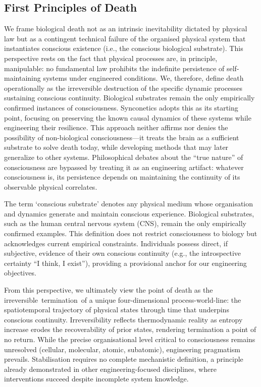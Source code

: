 \documentclass[10pt]{article}
\begin{document}
\begin{sloppypar}
  \subsection{First Principles of Death}
  \label{sec:first-principles}

  We frame biological death not as an intrinsic inevitability dictated by physical law but as a contingent technical failure of the organised physical system that instantiates conscious existence (i.e., the conscious biological substrate). This perspective rests on the fact that physical processes are, in principle, manipulable: no fundamental law prohibits the indefinite persistence of self-maintaining systems under engineered conditions. We, therefore, define death operationally as the irreversible destruction of the specific dynamic processes sustaining conscious continuity. Biological substrates remain the only empirically confirmed instances of consciousness. Synconetics adopts this as its starting point, focusing on preserving the known causal dynamics of these systems while engineering their resilience. This approach neither affirms nor denies the possibility of non-biological consciousness—it treats the brain as a sufficient substrate to solve death today, while developing methods that may later generalize to other systems. Philosophical debates about the “true nature” of consciousness are bypassed by treating it as an engineering artifact: whatever consciousness is, its persistence depends on maintaining the continuity of its observable physical correlates.

  The term ‘conscious substrate’ denotes any physical medium whose organisation and dynamics generate and maintain conscious experience. Biological substrates, such as the human central nervous system (CNS), remain the only empirically confirmed examples. This definition does not restrict consciousness to biology but acknowledges current empirical constraints. Individuals possess direct, if subjective, evidence of their own conscious continuity (e.g., the introspective certainty “I think, I exist”), providing a provisional anchor for our engineering objectives.

  From this perspective, we ultimately view the point of death as the irreversible termination of a unique four-dimensional process-world-line: the spatiotemporal trajectory of physical states through time that underpins conscious continuity. Irreversibility reflects thermodynamic reality as entropy increase erodes the recoverability of prior states, rendering termination a point of no return. While the precise organisational level critical to consciousness remains unresolved (cellular, molecular, atomic, subatomic), engineering pragmatism prevails. Stabilisation requires no complete mechanistic definition, a principle already demonstrated in other engineering-focused disciplines, where interventions succeed despite incomplete system knowledge.


\end{sloppypar}
\end{document}

